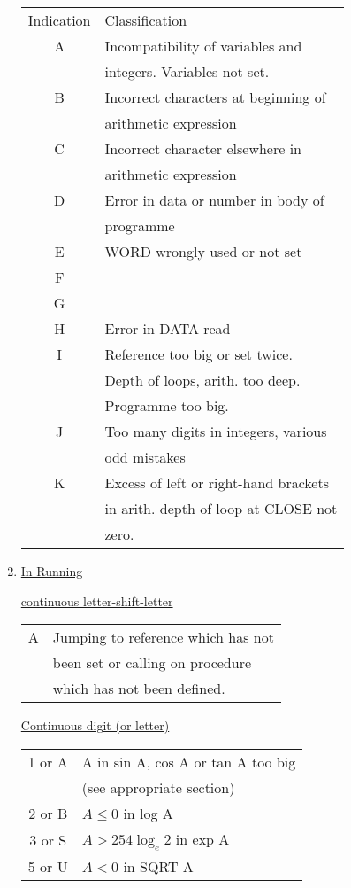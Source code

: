 \documentclass[10pt, a4paper, oneside]{article}
\newcommand{\myuline}[1]{\uline{#1}}
\begin{document}
\begin{multicols}{2}
\begin{enumerate}
\begin{tabular}{cl}
\myuline{Indication} & \myuline{Classification} \\
A & Incompatibility of variables and \\
  & integers. Variables not set. \\
B & Incorrect characters at beginning of \\
  & arithmetic expression \\
C & Incorrect character elsewhere in \\
  & arithmetic expression \\
D & Error in data or number in body of \\
  & programme \\
E & WORD wrongly used or not set \\
F & \\
G & \\
H & Error in DATA read \\
I & Reference too big or set twice. \\
  & Depth of loops, arith. too deep. \\
  & Programme too big. \\
J & Too many digits in integers, various \\
  & odd mistakes \\
K & Excess of left or right-hand brackets \\
  & in arith. depth of loop at CLOSE not \\
  & zero. \\
\end{tabular}

\item \myuline{In Running}

\myuline{continuous letter-shift-letter}

\begin{tabular}{cl}
A & Jumping to reference which has not \\
  & been set or calling on procedure \\
  & which has not been defined. \\
\end{tabular}

\myuline{Continuous digit (or letter)}

\begin{tabular}{cl}
1 or A & A in sin A, cos A or tan A too big \\
       & (see appropriate section) \\
2 or B & $A\leqslant 0$ in log A \\
3 or S & $A>254 \log_{e} 2$ in exp A \\
5 or U & $A<0$ in SQRT A \\
\end{tabular}
\end{enumerate}


\end{multicols}
\end{document}
